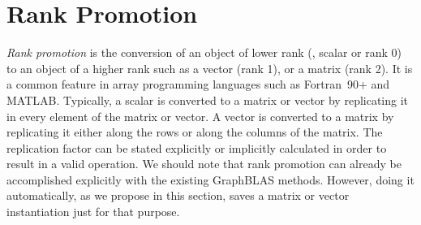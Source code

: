 \section{Rank Promotion}
\label{Sec:promotion}

\renewcommand{\vector}[1]{{\bf #1}}
\renewcommand{\matrix}[1]{{\bf #1}}

\emph{Rank promotion} is the conversion of an object of lower rank (\eg,
scalar or rank 0) to an object of a higher rank such as a vector (rank 1), or
a matrix (rank 2).
It is a common feature in array programming languages such as Fortran~90+
and MATLAB.  Typically, a scalar is converted to a matrix or vector
by replicating it in every element of the matrix or vector. A vector is
converted to a matrix by replicating it either along the rows or along the
columns of the matrix.  The replication factor can be stated explicitly
or implicitly calculated in order to result in a valid operation.
We should note that rank promotion can already be accomplished explicitly
with the existing GraphBLAS methods. However, doing it automatically, as
we propose in this section, saves a matrix or vector instantiation just for that purpose.

